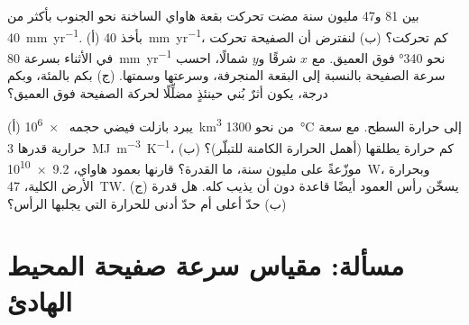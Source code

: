 \begin{exercise}[$\star\star\star$]\label{exo:b1:hotspots:11}
بين 81 و\num{47} مليون سنة مضت تحركت بقعة هاواي الساخنة نحو الجنوب بأكثر من \qty{40}{mm.yr^{-1}}. (أ) بأخذ \qty{40}{mm.yr^{-1}}، كم تحركت؟ (ب) لنفترض أن الصفيحة تحركت في الأثناء بسرعة \qty{80}{mm.yr^{-1}} نحو \ang{340} فوق  العميق. مع $x$ شرقًا و$y$ شمالًا، احسب سرعة الصفيحة بالنسبة إلى البقعة المنجرفة، وسرعتها وسمتها. (ج) بكم بالمئة، وبكم درجة، يكون أثرٌ بُني حينئذٍ مضلِّلًا لحركة الصفيحة فوق  العميق؟
\end{exercise}

\begin{exercise}[$\star\star\star$]\label{exo:b1:hotspots:12}
(أ) يبرد بازلت فيضي حجمه \qty{e6}{km^3} من نحو \qty{1300}{\celsius} إلى حرارة السطح. مع سعة حرارية قدرها \qty{3}{MJ.m^{-3}.K^{-1}}، كم حرارة يطلقها (أهمل الحرارة الكامنة للتبلّر)؟ (ب) موزّعةً على مليون سنة، ما القدرة؟ قارنها بعمود هاواي، \qty{9.2e10}{W}، وبحرارة الأرض الكلية، \qty{47}{TW}. (ج) يسخّن رأس العمود أيضًا قاعدة  دون أن يذيب كله. هل قدرة (ب) حدّ أعلى أم حدّ أدنى للحرارة التي يجلبها الرأس؟
\end{exercise}

\section{مسألة: مقياس سرعة صفيحة المحيط الهادئ}

